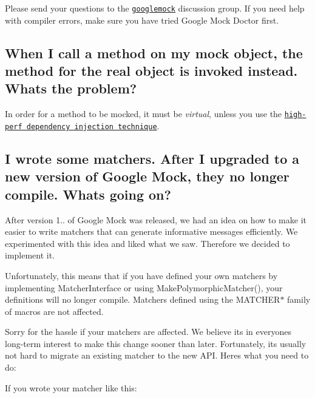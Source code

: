 Please send your questions to the \href{http://groups.google.com/group/googlemock}{\tt googlemock} discussion group. If you need help with compiler errors, make sure you have tried Google Mock Doctor first.

\subsection*{When I call a method on my mock object, the method for the real object is invoked instead. What\textquotesingle{}s the problem?}

In order for a method to be mocked, it must be {\itshape virtual}, unless you use the \href{CookBook.md#mocking-nonvirtual-methods}{\tt high-\/perf dependency injection technique}.

\subsection*{I wrote some matchers. After I upgraded to a new version of Google Mock, they no longer compile. What\textquotesingle{}s going on?}

After version 1.. of Google Mock was released, we had an idea on how to make it easier to write matchers that can generate informative messages efficiently. We experimented with this idea and liked what we saw. Therefore we decided to implement it.

Unfortunately, this means that if you have defined your own matchers by implementing {\ttfamily Matcher\+Interface} or using {\ttfamily Make\+Polymorphic\+Matcher()}, your definitions will no longer compile. Matchers defined using the {\ttfamily M\+A\+T\+C\+H\+E\+R$\ast$} family of macros are not affected.

Sorry for the hassle if your matchers are affected. We believe it\textquotesingle{}s in everyone\textquotesingle{}s long-\/term interest to make this change sooner than later. Fortunately, it\textquotesingle{}s usually not hard to migrate an existing matcher to the new A\+PI. Here\textquotesingle{}s what you need to do\+:

If you wrote your matcher like this\+: 
\begin{DoxyCode}{0}
\DoxyCodeLine{  \}}
\DoxyCodeLine{\};}
\end{DoxyCode}


